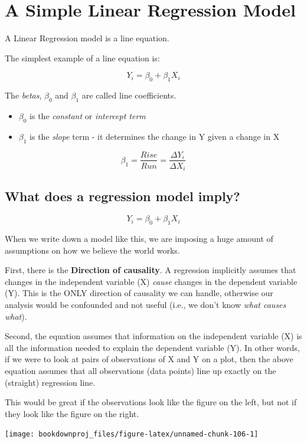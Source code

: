 \documentclass[
]{book}
\begin{document}
\section{A Simple Linear Regression Model}\label{a-simple-linear-regression-model}

A Linear Regression model is a line equation.

The simplest example of a line equation is:

\[Y_i=\beta_0+\beta_1X_i\]

The \emph{betas}, \(\beta_0\) and \(\beta_1\) are called line coefficients.

\begin{itemize}
\item
  \(\beta_0\) is the \emph{constant} or \emph{intercept term}
\item
  \(\beta_1\) is the \emph{slope} term - it determines the change in Y given a change in X
\end{itemize}

\[\beta_1=\frac{Rise}{Run}=\frac{\Delta Y_i}{\Delta X_i}\]

\subsection{What does a regression model imply?}\label{what-does-a-regression-model-imply}

\[Y_i=\beta_0+\beta_1X_i\]

When we write down a model like this, we are imposing a huge amount of assumptions on how we believe the world works.

First, there is the \textbf{Direction of causality}. A regression implicitly assumes that changes in the independent variable (X) \emph{cause} changes in the dependent variable (Y). This is the ONLY direction of causality we can handle, otherwise our analysis would be confounded and not useful (i.e., we don't know \emph{what causes what}).

Second, the equation assumes that information on the independent variable (X) is all the information needed to explain the dependent variable (Y). In other words, if we were to look at pairs of observations of X and Y on a plot, then the above equation assumes that all observations (data points) line up exactly on the (straight) regression line.

This would be great if the observations look like the figure on the left, but not if they look like the figure on the right.

\begin{center}\texttt{[image: bookdownproj\_files/figure-latex/unnamed-chunk-106-1]} \end{center}
\end{document}
